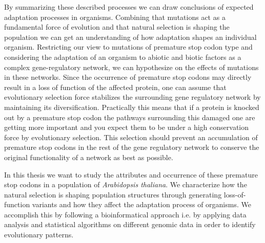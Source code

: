 By summarizing these described processes we can draw conclusions of expected adaptation processes in organisms. Combining that mutations act as a fundamental force of evolution and that natural selection is shaping the population we can get an understanding of how adaptation shapes an individual organism. Restricting our view to mutations of premature stop codon type and considering the adaptation of an organism to abiotic and biotic factors as a complex gene-regulatory network, we can hypothesize on the effects of mutations in these networks. Since the occurrence of premature stop codons may directly result in a loss of function of the affected protein, one can assume that evolutionary selection force stabilizes the surrounding gene regulatory network by maintaining its diversification. Practically this means that if a protein is knocked out by a premature stop codon the pathways surrounding this damaged one are getting more important and you expect them to be under a high conservation force by evolutionary selection. This selection should prevent an accumulation of premature stop codons in the rest of the gene regulatory network to conserve the original functionality of a network as best as possible.

In this thesis we want to study the attributes and occurrence of these premature stop codons in a population of \textit{Arabidopsis thaliana}. We characterize how the natural selection is shaping population structures through generating loss-of-function variants and how they affect the adaptation process of organisms. We accomplish this by following a bioinformatical approach i.e. by applying data analysis and statistical algorithms on different genomic data in order to identify evolutionary patterns. 